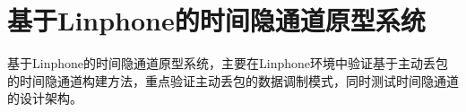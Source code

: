 \chapter{基于Linphone的时间隐通道原型系统}
\label{chap:linphone}

基于Linphone的时间隐通道原型系统，主要在Linphone环境中验证基于主动丢包的时间隐通道构建方法，重点验证主动丢包的数据调制模式，同时测试时间隐通道的设计架构。







